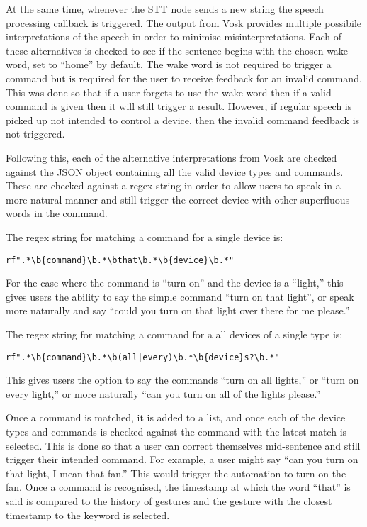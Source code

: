 At the same time, whenever the STT node sends a new string the speech processing callback is triggered.
The output from Vosk provides multiple possibile interpretations of the speech in order to minimise misinterpretations.
Each of these alternatives is checked to see if the sentence begins with the chosen wake word, set to ``home'' by default.
The wake word is not required to trigger a command but is required for the user to receive feedback for an invalid command.
This was done so that if a user forgets to use the wake word then if a valid command is given then it will still trigger a result.
However, if regular speech is picked up not intended to control a device, then the invalid command feedback is not triggered.

Following this, each of the alternative interpretations from Vosk are checked against the JSON object containing all the valid device types and commands.
These are checked against a regex string in order to allow users to speak in a more natural manner and still trigger the correct device with other superfluous words in the command.

The regex string for matching a command for a single device is:
\begin{center}
    \texttt{rf".*\textbackslash b\{command\}\textbackslash b.*\textbackslash bthat\textbackslash b.*\textbackslash b\{device\}\textbackslash b.*"}
\end{center}
For the case where the command is ``turn on'' and the device is a ``light,'' this gives users the ability to say the simple command ``turn on that light'', or speak more naturally and say ``could you turn on that light over there for me please.''

The regex string for matching a command for a all devices of a single type is:
\begin{center}
    \texttt{rf".*\textbackslash b\{command\}\textbackslash b.*\textbackslash b(all|every)\textbackslash b.*\textbackslash b\{device\}s?\textbackslash b.*"}
\end{center}
This gives users the option to say the commands ``turn on all lights,'' or ``turn on every light,'' or more naturally ``can you turn on all of the lights please.''

Once a command is matched, it is added to a list, and once each of the device types and commands is checked against the command with the latest match is selected.
This is done so that a user can correct themselves mid-sentence and still trigger their intended command.
For example, a user might say ``can you turn on that light, I mean that fan.''
This would trigger the automation to turn on the fan.
Once a command is recognised, the timestamp at which the word ``that'' is said is compared to the history of gestures and the gesture with the closest timestamp to the keyword is selected.

